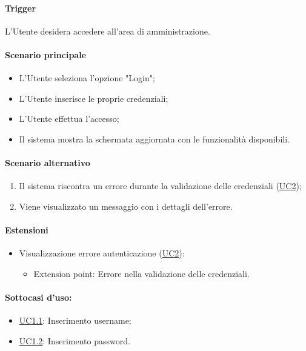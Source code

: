 \paragraph*{Trigger}
L'Utente desidera accedere all'area di amministrazione.

\paragraph*{Scenario principale}
\begin{itemize}
  \item L'Utente seleziona l'opzione "Login";
  \item L'Utente inserisce le proprie credenziali;
  \item L'Utente effettua l'accesso;
  \item Il sistema mostra la schermata aggiornata con le funzionalità disponibili.
\end{itemize}

\paragraph*{Scenario alternativo}
\begin{enumerate}
  \item Il sistema riscontra un errore durante la validazione delle credenziali (\hyperref[UC2]{UC2});
  \item Viene visualizzato un messaggio con i dettagli dell'errore.
\end{enumerate}

\paragraph*{Estensioni}
\begin{itemize}
  \item Visualizzazione errore autenticazione (\hyperref[UC2]{UC2}):
  \begin{itemize}
    \item Extension point: Errore nella validazione delle credenziali.
  \end{itemize}
\end{itemize}

\paragraph*{Sottocasi d'uso:}
\begin{itemize}
  \item \hyperref[UC1point1]{UC1.1}: Inserimento username;
  \item \hyperref[UC1point2]{UC1.2}: Inserimento password.
\end{itemize}

